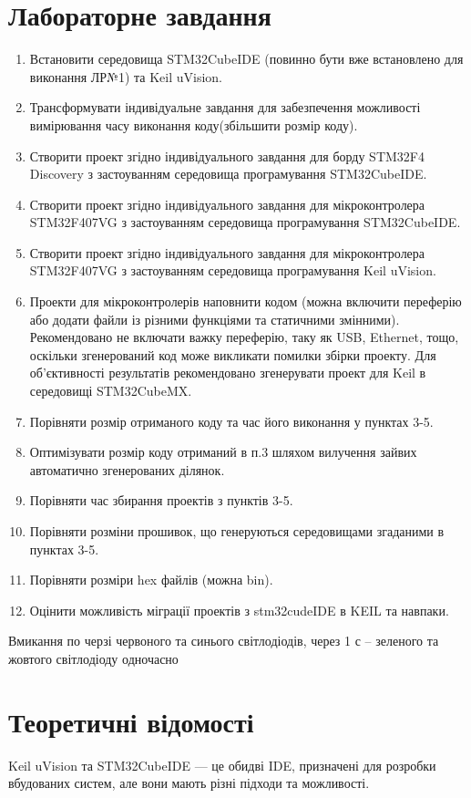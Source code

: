 \documentclass[oneside,14pt]{extarticle}
\begin{document}
\begin{normalsize}
    \section*{\hfil Лабораторне завдання\hfil}
	\begin{enumerate}
		\item Встановити середовища STM32CubeIDE (повинно бути вже встановлено для виконання
		ЛР№1) та Keil uVision.
		\item Трансформувати індивідуальне завдання для забезпечення можливості вимірювання часу
		виконання коду(збільшити розмір коду).
		\item Створити проект згідно індивідуального завдання для борду STM32F4 Discovery з
		застоуванням середовища програмування STM32CubeIDE.
		\item Створити проект згідно індивідуального завдання для мікроконтролера STM32F407VG з
		застоуванням середовища програмування STM32CubeIDE.
		\item Створити проект згідно індивідуального завдання для мікроконтролера STM32F407VG з
		застоуванням середовища програмування Keil uVision.
		\item Проекти для мікроконтролерів наповнити кодом (можна включити переферію або додати
		файли із різними функціями та статичними змінними).
		Рекомендовано не включати важку переферію, таку як USB, Ethernet, тощо, оскільки
		згенерований код може викликати помилки збірки проекту.
		Для об’єктивності результатів рекомендовано згенерувати проект для Keil в середовищі
		STM32CubeMX.
		\item Порівняти розмір отриманого коду та час його виконання у пунктах 3-5.
		\item Оптимізувати розмір коду отриманий в п.3 шляхом вилучення зайвих автоматично
		згенерованих ділянок.
		\item Порівняти час збирання проектів з пунктів 3-5.
		\item Порівняти розміни прошивок, що генеруються середовищами згаданими в пунктах 3-5.
		\item Порівняти розміри hex файлів (можна bin).
		\item Оцінити можливість міграції проектів з stm32cudeIDE в KEIL та навпаки.
	\end{enumerate}

Вмикання по черзі червоного та синього світлодіодів, через 1 с – зеленого та жовтого
світлодіоду одночасно

\section*{\hfil Теоретичні відомості\hfil}
Keil uVision та STM32CubeIDE — це обидві IDE, призначені для розробки вбудованих систем, але вони мають різні підходи та можливості.


\end{normalsize}
\end{document}
